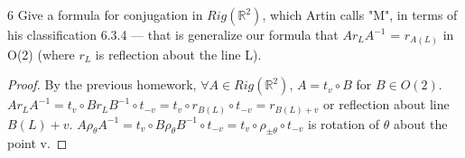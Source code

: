 \documentclass{article}
\newcommand{\R}{\mathbb{R}}
\begin{document}
\bigskip

\begin{claim}{6}
    Give a formula for conjugation in $Rig(\R^2)$, which Artin calls "M", in terms of his classification 6.3.4 --- that is generalize our formula that  $A r_L A^{-1}$ = $r_{A(L)}$ in O(2) (where $r_L$ is reflection about the line L).
\end{claim}
\begin{proof}
    By the previous homework, $\forall A \in Rig(\R^2)$, $A = t_v \circ B$ for $B \in O(2)$. $A r_L A^{-1} = t_v \circ B r_L B^{-1} \circ t_{-v} = t_v \circ r_{B(L)} \circ t_{-v} = r_{B(L) + v}$ or reflection about line $B(L) + v$. $A \rho_\theta A^{-1} = t_v \circ B \rho_\theta B^{-1} \circ t_{-v} = t_v \circ \rho_{\pm\theta} \circ t_{-v}$ is rotation of $\theta$ about the point v.
\end{proof}
\end{document}
